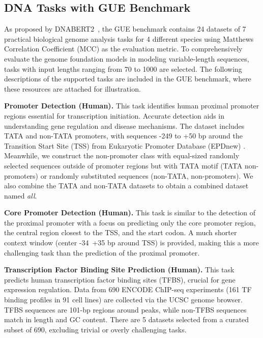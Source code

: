 \subsection{DNA Tasks with GUE Benchmark}
As proposed by DNABERT2~\citep{iclr2024dnabert2}, the GUE benchmark contains 24 datasets of 7 practical biological genome analysis tasks for 4 different species using Matthews Correlation Coefficient (MCC) as the evaluation metric. To comprehensively evaluate the genome foundation models in modeling variable-length sequences, tasks with input lengths ranging from 70 to 1000 are selected. The following descriptions of the supported tasks are included in the GUE benchmark, where these resources are attached for illustration.

\textbf{Promoter Detection (Human).}\quad
This task identifies human proximal promoter regions essential for transcription initiation. Accurate detection aids in understanding gene regulation and disease mechanisms. The dataset includes TATA and non-TATA promoters, with sequences -249 to +50 bp around the Transition Start Site (TSS) from Eukaryotic Promoter Database (EPDnew) \citep{dreos2013epdpromoter}. Meanwhile, we construct the non-promoter class with equal-sized randomly selected sequences outside of promoter regions but with TATA motif (TATA non-promoters) or randomly substituted sequences (non-TATA, non-promoters). We also combine the TATA and non-TATA datasets to obtain a combined dataset named \textit{all}.

\textbf{Core Promoter Detection (Human).}\quad
This task is similar to the detection of the proximal promoter with a focus on predicting only the core promoter region, the central region closest to the TSS, and the start codon. A much shorter context window (center -34~+35 bp around TSS) is provided, making this a more challenging task than the prediction of the proximal promoter. 

\textbf{Transcription Factor Binding Site Prediction (Human).}\quad
This task predicts human transcription factor binding sites (TFBS), crucial for gene expression regulation. Data from 690 ENCODE ChIP-seq experiments (161 TF binding profiles in 91 cell lines) \citep{mouse2012encyclopedia} are collected via the UCSC genome browser. TFBS sequences are 101-bp regions around peaks, while non-TFBS sequences match in length and GC content. There are 5 datasets selected from a curated subset of 690, excluding trivial or overly challenging tasks.

